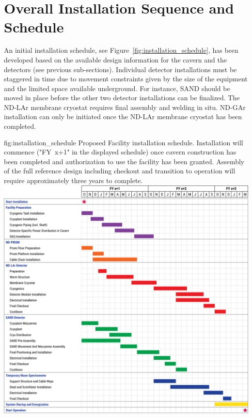 \section{Overall Installation Sequence and Schedule}
\label{sec:int-inst-seq-sched}


An initial installation schedule, see Figure~\ref{fig:installation_schedule}, has been developed based on the available design information for the cavern and the detectors (see previous sub-sections). Individual detector installations must be staggered in time due to movement constraints given by the size of the equipment and the limited space available underground. For instance, SAND should be moved in place before the other two detector installations can be finalized. The ND-LAr membrane cryostat requires final assembly and welding in situ. ND-GAr installation can only be initiated once the ND-LAr membrane cryostat has been completed.

\begin{dunefigure}{fig:installation_schedule}
{Proposed   Facility installation schedule. Installation will commence ("FY~x+1" in the displayed schedule) once cavern construction has been completed and authorization to use the  facility has been granted. Assembly of the full   reference design including checkout and transition to operation will require approximately three years to complete.}
\includegraphics[width=1.0\textwidth]{graphics/i-and-i/installation_schedule}
\end{dunefigure}


